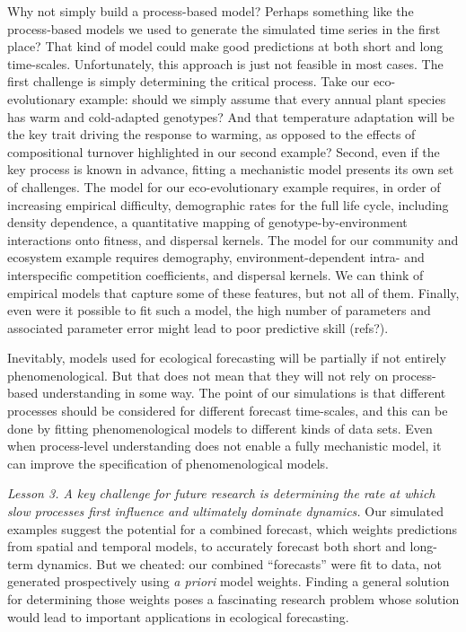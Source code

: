 \documentclass[11pt]{article}
\begin{document}
 Why not simply build a process-based model? Perhaps something like the process-based models we used to generate the simulated time series in the first place? 
 That kind of model could make good predictions at both short and long time-scales. Unfortunately, this approach is just not feasible in most cases.
 The first challenge is simply determining the critical process. Take our eco-evolutionary example: should we simply assume that every annual plant species
 has warm and cold-adapted genotypes? And that temperature adaptation will be the key trait driving the response to warming, as opposed to the effects of 
 compositional turnover highlighted in our second example? Second, even if the key process is known in advance, fitting a mechanistic model presents its
 own set of challenges. The model for our eco-evolutionary example requires, in order of increasing empirical difficulty, demographic rates for the full life
 cycle, including density dependence, a quantitative mapping of genotype-by-environment interactions onto fitness, and dispersal kernels. The model for 
 our community and ecosystem example requires demography, environment-dependent intra- and interspecific competition coefficients, and dispersal kernels.
 We can think of empirical models that capture some of these features, but not all of them. Finally, even were it possible to fit such a model, the high number of 
 parameters and associated parameter error might lead to poor predictive skill (refs?).
 
Inevitably, models used for ecological forecasting will be partially if not entirely phenomenological. But that does not mean that they will not rely on process-based
understanding in some way. The point of our simulations is that different processes should be considered for different forecast time-scales, and this can be done 
by fitting phenomenological models to different kinds of data sets. Even when process-level understanding does not enable a fully mechanistic model, it can
improve the specification of phenomenological models.
 
\emph{Lesson 3. A key challenge for future research is determining the rate at which slow processes first influence and ultimately dominate dynamics.}
Our simulated examples suggest the potential for a combined forecast, which weights predictions from spatial and temporal models, to 
accurately forecast both short and long-term dynamics. But we cheated: our combined ``forecasts'' were fit to data, not generated prospectively
using \emph{a priori} model weights. Finding a general solution for determining those weights poses a fascinating research problem whose 
solution would lead to important applications in ecological forecasting. 
\end{document}
